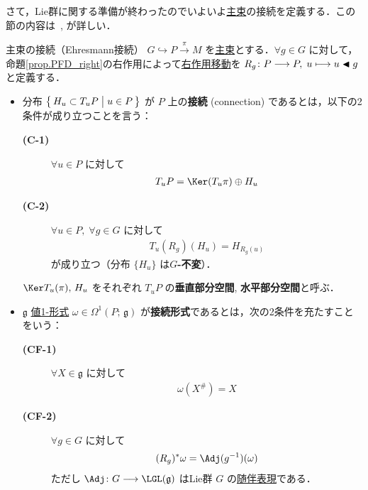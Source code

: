 \documentclass[geometry_main]{subfiles}
\begin{document}
さて，Lie群に関する準備が終わったのでいよいよ\hyperref[def.PFD]{主束}の接続を定義する．この節の内容は~\cite[第6章]{Imano}, \cite[\S 28]{Tu2017differential}が詳しい．


\begin{mydef}[label=def:connection,breakable]{主束の接続（Ehresmann接続）}
    $G \hookrightarrow P \xrightarrow{\pi} M$ を\hyperref[def.PFD]{主束}とする．$\forall g \in G$ に対して，命題\ref{prop.PFD_right}の右作用によって\hyperref[def:fundamental-vecf]{右作用移動}を $R_g \colon P \longrightarrow P,\; u \longmapsto u \blacktriangleleft g$ と定義する．
    \begin{itemize}
        \item 分布 $\bigl\{\, H_u \subset T_u P \bigm| u \in P \,\bigr\}$ が $P$ 上の\textbf{接続} (connection) であるとは，以下の2条件が成り立つことを言う：
        \begin{description}
            \item[\textbf{(C-1)}]  $\forall u \in P$ に対して
            \begin{align}
                T_u P = \Ker (T_u \pi) \oplus H_u
            \end{align}
            \item[\textbf{(C-2)}] $\forall u \in P,\; \forall g \in G$ に対して
            \begin{align}
                T_u(R_g) (H_u) = H_{R_g(u)}
            \end{align}
            が成り立つ（分布 $\{H_u\}$ は\textbf{$G$-不変}）．
        \end{description}
        $\Ker T_u (\pi),\, H_u$ をそれぞれ $T_u P$ の\textbf{垂直部分空間}, \textbf{水平部分空間}と呼ぶ．
        \item $\mathfrak{g}$ \hyperref[eq:E-valued]{値1-形式} $\omega \in \Omega^1(P;\, \mathfrak{g})$ が\textbf{接続形式}であるとは，次の2条件を充たすことをいう：
        \begin{description}
            \item[\textbf{(CF-1)}] $\forall X \in \mathfrak{g}$ に対して
            \begin{align}
                \omega(X^\#) = X
            \end{align}
            \item[\textbf{(CF-2)}] $\forall g \in G$ に対して
            \begin{align}
                (R_g)^* \omega = \Adj (g^{-1})(\omega)
            \end{align}
            ただし $\Adj \colon G \lto \LGL (\mathfrak{g})$ はLie群 $G$ の\hyperref[def:Lie-adj]{随伴表現}である．
        \end{description}
    \end{itemize}
    
\end{mydef}
\end{document}
